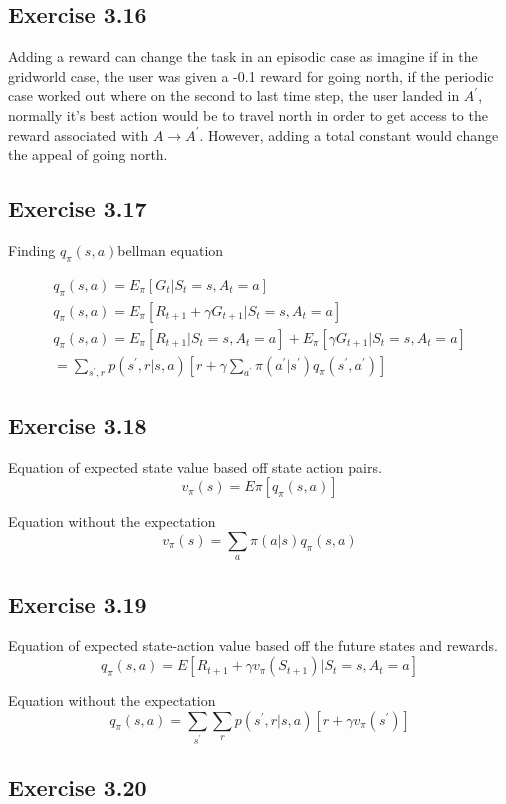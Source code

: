 \subsection{Exercise 3.16}
Adding a reward can change the task in an episodic case as imagine if in the gridworld case, the user was given a -0.1 reward for going north, if the periodic case worked out where on the second to last time step, the user landed in $A^\prime$, normally it's best action would be to travel north in order to get access to the reward associated with $A \rightarrow A^\prime$. However, adding a total constant would change the appeal of going north.

\subsection{Exercise 3.17}
Finding $q_\pi(s,a)$bellman equation

\begin{gather}
  q_\pi(s,a) = E_\pi[G_t | S_t=s, A_t = a] \\
  q_\pi(s,a) = E_\pi[R_{t+1} + \gamma G_{t+1} | S_t=s, A_t = a] \\
  q_\pi(s,a) = E_\pi[R_{t+1} | S_t= s, A_t = a] + E_\pi[\gamma G_{t+1} | S_t=s, A_t = a] \\
  = \sum_{s^\prime,r} p(s^\prime, r | s,a)[r + \gamma \sum_{a^\prime} \pi(a^\prime|s^\prime) q_\pi(s^\prime,a^\prime)]
\end{gather}

\subsection{Exercise 3.18}
Equation of expected state value based off state action pairs. 
\begin{equation}
  v_\pi(s) = E\pi[q_\pi(s,a)]
\end{equation}

Equation without the expectation
\begin{equation}
  v_\pi(s) = \sum_{a}\pi(a|s) q_\pi(s,a)
\end{equation}

\subsection{Exercise 3.19}
Equation of expected state-action value based off the future states and rewards.
\begin{equation}
  q_\pi(s,a) = E[R_{t+1} + \gamma v_\pi(S_{t+1}) | S_t = s, A_t = a ]
\end{equation}

Equation without the expectation
\begin{equation}
  q_\pi(s,a) = \sum_{s^\prime} \sum_r p(s^\prime, r| s,a)[r+\gamma v_\pi(s^\prime)]
\end{equation}

\subsection{Exercise 3.20}